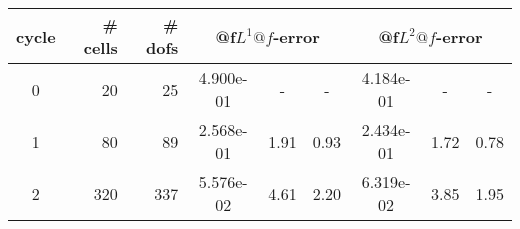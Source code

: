 \documentclass[10pt]{report}
\begin{document}
\begin{table}[H]
\begin{center}
\begin{tabular}{|c|r|r|c|c|c|c|c|c|} \hline
cycle & \# cells & \# dofs & 
\multicolumn{3}{|c|}{@f$L^1@f$-error} & 
\multicolumn{3}{|c|}{@f$L^2@f$-error}\\ \hline
0 & 20 & 25 & 4.900e-01 & - & - & 4.184e-01 & - & -\\ \hline
1 & 80 & 89 & 2.568e-01 & 1.91 & 0.93 & 2.434e-01 & 1.72 & 0.78\\ \hline
2 & 320 & 337 & 5.576e-02 & 4.61 & 2.20 & 6.319e-02 & 3.85 & 1.95\\ \hline
\end{tabular}
\end{center}
\end{table}
\end{document}
